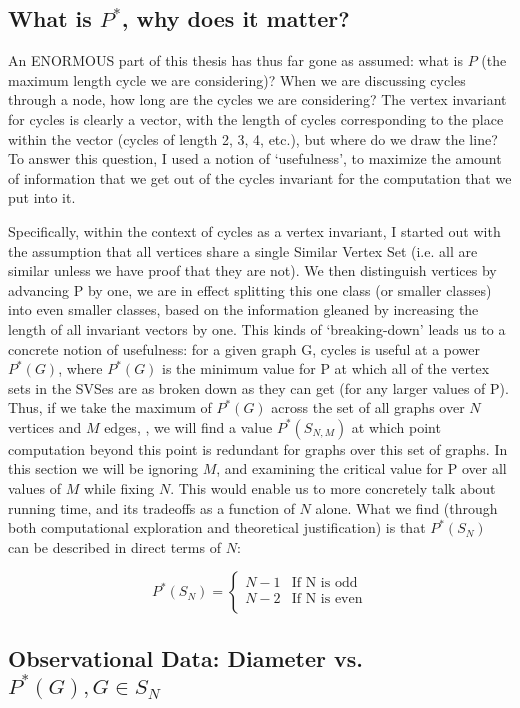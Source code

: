 \subsection{What is $P^*$, why does it matter?}

An ENORMOUS part of this thesis has thus far gone as assumed: what is $P$ (the maximum length cycle we are considering)?
When we are discussing cycles through a node, how long are the cycles we are considering?
The vertex invariant for cycles is clearly a vector, with the length of cycles corresponding to the place within the vector (cycles of length 2, 3, 4, etc.), but where do we draw the line?
To answer this question, I used a notion of `usefulness', to maximize the amount of information that we get out of the cycles invariant for the computation that we put into it.

Specifically, within the context of cycles as a vertex invariant, I started out with the assumption that all vertices share a single Similar Vertex Set (i.e. all are similar unless we have proof that they are not).
We then distinguish vertices by advancing P by one, we are in effect splitting this one class (or smaller classes) into even smaller classes, based on the information gleaned by increasing the length of all invariant vectors by one.
This kinds of `breaking-down' leads us to a concrete notion of usefulness: for a given graph G, cycles is useful at a power $P^*(G)$, where $P^*(G)$ is the minimum value for P at which all of the vertex sets in the SVSes are as broken down as they can get (for any larger values of P).
Thus, if we take the maximum of $P^*(G)$ across the set of all graphs over $N$ vertices and $M$ edges, , we will find a value $P^*(S_{N,M})$ at which point computation beyond this point is redundant for graphs over this set of graphs.
In this section we will be ignoring $M$, and examining the critical value for P over all values of $M$ while fixing $N$.
This would enable us to more concretely talk about running time, and its tradeoffs as a function of $N$ alone.
What we find (through both computational exploration and theoretical justification) is that $P^*(S_{N})$ can be described in direct terms of $N$:

\[ P^*(S_{N}) = \begin{cases} 
      N-1 & \text{If N is odd} \\
      N-2 & \text{If N is even} \\
   \end{cases}
\]

\subsection{Observational Data: Diameter vs. $P^*(G), G \in S_N$}

